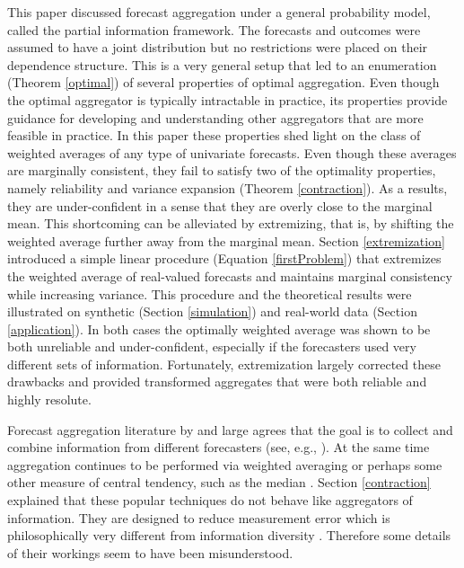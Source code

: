 \documentclass[11pt]{article}
\theoremstyle{definition}
\theoremstyle{definition}
\begin{document}
This paper discussed forecast aggregation under a general probability model, called the partial information framework. The forecasts and outcomes were assumed to have a joint distribution but no restrictions were placed on their dependence structure. This is a very general setup that led to an enumeration (Theorem \ref{optimal}) of several properties of optimal aggregation. Even though the optimal aggregator is typically intractable in practice, its properties provide guidance for developing and understanding other aggregators that are more feasible in practice. In this paper these properties shed light on the class of weighted averages of any type of univariate forecasts. Even though these averages are marginally consistent, they fail to satisfy two of the optimality properties, namely reliability and variance expansion (Theorem \ref{contraction}). As a results, they are under-confident in a sense that they are overly close to the marginal mean. This shortcoming can be alleviated by extremizing, that is, by shifting the weighted average further away from the marginal mean.  Section \ref{extremization} introduced a simple linear procedure (Equation \ref{firstProblem}) that extremizes the weighted average of real-valued forecasts and maintains marginal consistency while increasing variance. This procedure and the theoretical results were illustrated on synthetic (Section \ref{simulation}) and real-world data (Section \ref{application}). In both cases the optimally weighted average was shown to be both unreliable and under-confident, especially if the forecasters used very different sets of information. Fortunately, extremization largely corrected these drawbacks and provided transformed aggregates that were both reliable and highly resolute. 

Forecast aggregation literature by and large agrees that the goal is to collect and combine  information from different forecasters (see, e.g., \citealt{forlines2012heuristics, armstrong2, dawid1995coherent}). At the same time aggregation continues to be performed via weighted averaging or perhaps some other measure of central tendency, such as the median \citep{armstrong2, levins1966strategy, lobo2010human}. Section \ref{contraction} explained that these popular techniques do not behave like aggregators of information. They are designed to reduce measurement error which is philosophically very different from information diversity \citep{satopaamodeling2}. Therefore some details of their workings seem to have been misunderstood.
\end{document}
